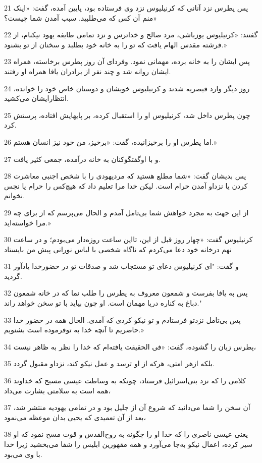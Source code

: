 \par 21 پس پطرس نزد آنانی که کرنیلیوس نزد وی فرستاده بود، پایین آمده، گفت: «اینک منم آن کس که می‌طلبید. سبب آمدن شما چیست؟»
\par 22 گفتند: «کرنیلیوس یوزباشی، مرد صالح و خداترس و نزد تمامی طایفه یهود نیکنام، از فرشته مقدس الهام یافت که تو را به خانه خود بطلبد و سخنان از تو بشنود.»
\par 23 پس ایشان را به خانه برده، مهمانی نمود. وفردای آن روز پطرس برخاسته، همراه ایشان روانه شد و چند نفر از برادران یافا همراه او رفتند.
\par 24 روز دیگر وارد قیصریه شدند و کرنیلیوس خویشان و دوستان خاص خود را خوانده، انتظارایشان می‌کشید.
\par 25 چون پطرس داخل شد، کرنیلیوس او را استقبال کرده، بر پایهایش افتاده، پرستش کرد.
\par 26 اما پطرس او را برخیزانیده، گفت: «برخیز، من خود نیز انسان هستم.»
\par 27 و با اوگفتگوکنان به خانه درآمده، جمعی کثیر یافت.
\par 28 پس بدیشان گفت: «شما مطلع هستید که مردیهودی را با شخص اجنبی معاشرت کردن یا نزداو آمدن حرام است. لیکن خدا مرا تعلیم داد که هیچ‌کس را حرام یا نجس نخوانم.
\par 29 از این جهت به مجرد خواهش شما بی‌تامل آمدم و الحال می‌پرسم که از برای چه مرا خواسته‌اید.»
\par 30 کرنیلیوس گفت: «چهار روز قبل از این، تااین ساعت روزه‌دار می‌بودم؛ و در ساعت نهم درخانه خود دعا می‌کردم که ناگاه شخصی با لباس نورانی پیش من بایستاد
\par 31 و گفت: "ای کرنیلیوس دعای تو مستجاب شد و صدقات تو در حضورخدا یادآور گردید.
\par 32 پس به یافا بفرست و شمعون معروف به پطرس را طلب نما که در خانه شمعون دباغ به کناره دریا مهمان است. او چون بیاید با تو سخن خواهد راند."
\par 33 پس بی‌تامل نزدتو فرستادم و تو نیکو کردی که آمدی. الحال همه در حضور خدا حاضریم تا آنچه خدا به توفرموده است بشنویم.»
\par 34 پطرس زبان را گشوده، گفت: «فی الحقیقت یافته‌ام که خدا را نظر به ظاهر نیست،
\par 35 بلکه ازهر امتی، هر‌که از او ترسد و عمل نیکو کند، نزداو مقبول گردد.
\par 36 کلامی را که نزد بنی‌اسرائیل فرستاد، چونکه به وساطت عیسی مسیح که خداوند همه است به سلامتی بشارت می‌داد،
\par 37 آن سخن را شما می‌دانید که شروع آن از جلیل بود و در تمامی یهودیه منتشر شد، بعد از آن تعمیدی که یحیی بدان موعظه می‌نمود،
\par 38 یعنی عیسی ناصری را که خدا او را چگونه به روح‌القدس و قوت مسح نمود که او سیر کرده، اعمال نیکو به‌جا می‌آورد و همه مقهورین ابلیس را شفا می‌بخشید زیرا خدا با وی می‌بود.
